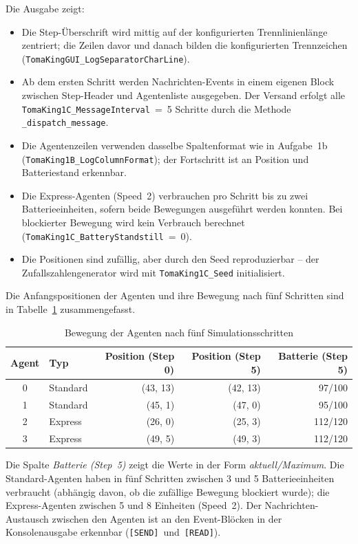Die Ausgabe zeigt:
\begin{itemize}
    \item Die Step-Überschrift wird mittig auf der konfigurierten Trennlinienlänge zentriert; die Zeilen davor und danach bilden die konfigurierten Trennzeichen (\texttt{TomaKingGUI\_LogSeparatorCharLine}).
    \item Ab dem ersten Schritt werden Nachrichten-Events in einem eigenen Block zwischen Step-Header und Agentenliste ausgegeben. Der Versand erfolgt alle \texttt{TomaKing1C\_MessageInterval}~=~5 Schritte durch die Methode \texttt{\_dispatch\_message}.
    \item Die Agentenzeilen verwenden dasselbe Spaltenformat wie in Aufgabe~1b \\ (\texttt{TomaKing1B\_LogColumnFormat}); der Fortschritt ist an Position und Batteriestand erkennbar.
    \item Die Express-Agenten (Speed~2) verbrauchen pro Schritt bis zu zwei Batterieeinheiten, sofern beide Bewegungen ausgeführt werden konnten. Bei blockierter Bewegung wird kein Verbrauch berechnet (\texttt{TomaKing1C\_BatteryStandstill}~=~0).
    \item Die Positionen sind zufällig, aber durch den Seed reproduzierbar -- der Zufallszahlengenerator wird mit \texttt{TomaKing1C\_Seed} initialisiert.
\end{itemize}

Die Anfangspositionen der Agenten und ihre Bewegung nach fünf Schritten sind in Tabelle~\ref{tab:simulation1c_movement} zusammengefasst.

\begin{table}[H]
    \centering
    \begin{tabular}{c l r r r}
        \toprule
        \textbf{Agent} & \textbf{Typ} & \textbf{Position (Step 0)} & \textbf{Position (Step 5)} & \textbf{Batterie (Step 5)} \\
        \midrule
        0 & Standard & (43, 13) & (42, 13) & 97/100 \\
        1 & Standard & (45, 1)  & (47, 0)  & 95/100 \\
        2 & Express  & (26, 0)  & (25, 3)  & 112/120 \\
        3 & Express  & (49, 5)  & (49, 3)  & 112/120 \\
        \bottomrule
    \end{tabular}
    \caption{Bewegung der Agenten nach fünf Simulationsschritten}
    \label{tab:simulation1c_movement}
\end{table}

Die Spalte \textit{Batterie (Step~5)} zeigt die Werte in der Form \textit{aktuell/Maximum}. Die Standard-Agenten haben in fünf Schritten zwischen 3 und 5 Batterieeinheiten verbraucht (abhängig davon, ob die zufällige Bewegung blockiert wurde); die Express-Agenten zwischen 5 und 8 Einheiten (Speed~2). Der Nachrichten-Austausch zwischen den Agenten ist an den Event-Blöcken in der Konsolenausgabe erkennbar (\texttt{[SEND]}~und~\texttt{[READ]}).

